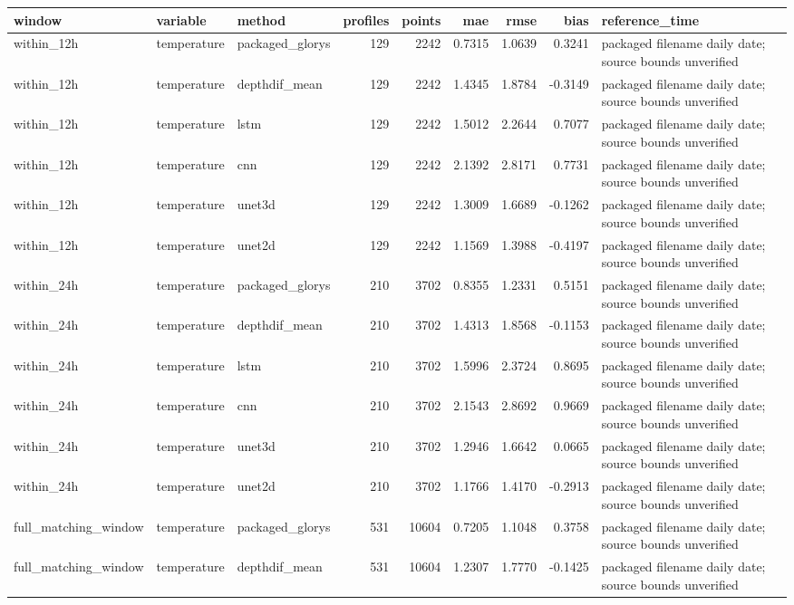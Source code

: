 \begin{tabular}{lllrrrrrl}
\toprule
window & variable & method & profiles & points & mae & rmse & bias & reference_time \\
\midrule
within_12h & temperature & packaged_glorys & 129 & 2242 & 0.7315 & 1.0639 & 0.3241 & packaged filename daily date; source bounds unverified \\
within_12h & temperature & depthdif_mean & 129 & 2242 & 1.4345 & 1.8784 & -0.3149 & packaged filename daily date; source bounds unverified \\
within_12h & temperature & lstm & 129 & 2242 & 1.5012 & 2.2644 & 0.7077 & packaged filename daily date; source bounds unverified \\
within_12h & temperature & cnn & 129 & 2242 & 2.1392 & 2.8171 & 0.7731 & packaged filename daily date; source bounds unverified \\
within_12h & temperature & unet3d & 129 & 2242 & 1.3009 & 1.6689 & -0.1262 & packaged filename daily date; source bounds unverified \\
within_12h & temperature & unet2d & 129 & 2242 & 1.1569 & 1.3988 & -0.4197 & packaged filename daily date; source bounds unverified \\
within_24h & temperature & packaged_glorys & 210 & 3702 & 0.8355 & 1.2331 & 0.5151 & packaged filename daily date; source bounds unverified \\
within_24h & temperature & depthdif_mean & 210 & 3702 & 1.4313 & 1.8568 & -0.1153 & packaged filename daily date; source bounds unverified \\
within_24h & temperature & lstm & 210 & 3702 & 1.5996 & 2.3724 & 0.8695 & packaged filename daily date; source bounds unverified \\
within_24h & temperature & cnn & 210 & 3702 & 2.1543 & 2.8692 & 0.9669 & packaged filename daily date; source bounds unverified \\
within_24h & temperature & unet3d & 210 & 3702 & 1.2946 & 1.6642 & 0.0665 & packaged filename daily date; source bounds unverified \\
within_24h & temperature & unet2d & 210 & 3702 & 1.1766 & 1.4170 & -0.2913 & packaged filename daily date; source bounds unverified \\
full_matching_window & temperature & packaged_glorys & 531 & 10604 & 0.7205 & 1.1048 & 0.3758 & packaged filename daily date; source bounds unverified \\
full_matching_window & temperature & depthdif_mean & 531 & 10604 & 1.2307 & 1.7770 & -0.1425 & packaged filename daily date; source bounds unverified \\

\end{tabular}
